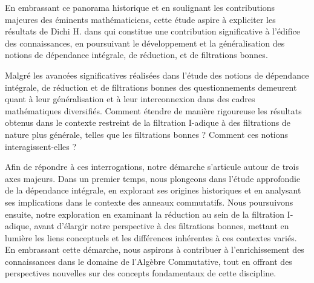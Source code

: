 En embrassant ce panorama historique et en soulignant les contributions majeures des éminents mathématiciens, cette étude aspire à expliciter les résultats de Dichi H. dans \cite{Di2} qui constitue une contribution significative à l'édifice des connaissances, en poursuivant le développement et la généralisation des notions de dépendance intégrale, de réduction, et de filtrations bonnes.

Malgré les avancées significatives réalisées dans l'étude des notions de dépendance intégrale, de réduction et de filtrations bonnes des questionnements demeurent quant à leur généralisation et à leur interconnexion dans des cadres mathématiques diversifiés. Comment étendre de manière rigoureuse les résultats obtenus dans le contexte restreint de la filtration I-adique à des filtrations de nature plus générale, telles que les filtrations bonnes ? Comment ces notions interagissent-elles ? 

Afin de répondre à ces interrogations, notre démarche s'articule autour de trois axes majeurs. Dans un premier temps, nous plongeons dans l'étude approfondie de la dépendance intégrale, en explorant ses origines historiques et en analysant ses implications dans le contexte des anneaux commutatifs. Nous poursuivons ensuite, notre exploration en examinant la réduction au sein de la filtration I-adique, avant d'élargir notre perspective à des filtrations bonnes, mettant en lumière les liens conceptuels et les différences inhérentes à ces contextes variés. En embrassant cette démarche, nous aspirons à contribuer à l'enrichissement des connaissances dans le domaine de l'Algèbre Commutative, tout en offrant des perspectives nouvelles sur des concepts fondamentaux de cette discipline.


